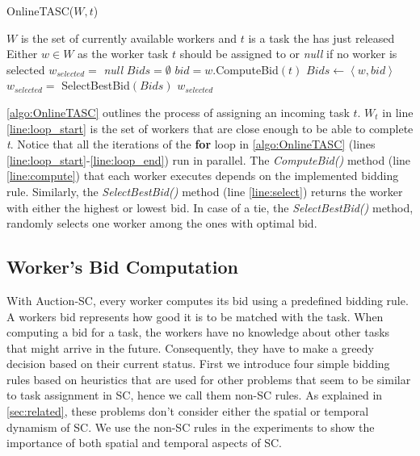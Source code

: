 \begin{algorithm}
\caption{OnlineTASC($W, t$)}
\label{algo:OnlineTASC}
\begin{algorithmic}[1]
\REQUIRE $W$ is the set of currently available workers and $t$ is a task the has just released
\ENSURE Either $w \in W$ as the worker task $t$ should be assigned to or \emph{null} if no worker is selected
\STATE $w_{selected} = $ \emph{null}
\STATE $Bids = \emptyset$
 \label{line:loop_start}
	\STATE $bid = w$.ComputeBid$(t)$ \label{line:compute}
	\STATE $Bids \leftarrow \left\langle w, bid \right\rangle$
\ENDFOR \label{line:loop_end}
\STATE $w_{selected} = $ SelectBestBid$(Bids)$ \label{line:select}
\RETURN $w_{selected}$
\end{algorithmic}
\end{algorithm}

\cref{algo:OnlineTASC} outlines the process of assigning an incoming task $t$. $W_t$ in line \ref{line:loop_start} is the set of workers that are close enough to be able to complete \textit{t}. Notice that all the iterations of the \textbf{for} loop in \cref{algo:OnlineTASC} (lines \ref{line:loop_start}-\ref{line:loop_end}) run in parallel. The \emph{ComputeBid()} method (line \ref{line:compute}) that each worker executes depends on the implemented bidding rule. Similarly, the \emph{SelectBestBid()} method (line \ref{line:select}) returns the worker with either the highest or lowest bid. In case of a tie, the \emph{SelectBestBid()} method, randomly selects one worker among the ones with optimal bid.

\subsection{Worker's Bid Computation}

With Auction-SC, every worker computes its bid using a predefined bidding rule. A workers bid represents how good it is to be matched with the task. When computing a bid for a task, the workers have no knowledge about other tasks that might arrive in the future. Consequently, they have to make a greedy decision based on their current status. First we introduce four simple bidding rules based on heuristics that are used for other problems that seem to be similar to task assignment in SC, hence we call them non-SC rules. As explained in \cref{sec:related}, these problems don't consider either the spatial or temporal dynamism of SC. We use the non-SC rules in the experiments to show the importance of both spatial and temporal aspects of SC.

